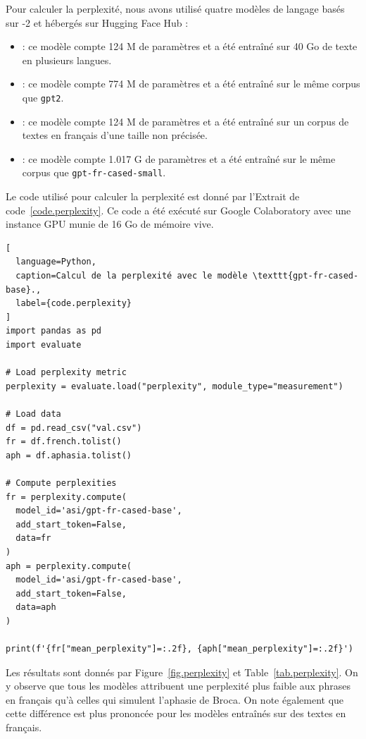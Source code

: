 Pour calculer la perplexité, nous avons utilisé quatre modèles de langage basés sur -2
et hébergés sur \foreignlanguage{english}{Hugging Face Hub} :
\begin{itemize}
  \item {} : 
  ce modèle compte 124 M de paramètres et a été entraîné sur 40 Go de texte en plusieurs langues.
  \item {} :
  ce modèle compte 774 M de paramètres et a été entraîné sur le même corpus que \verb|gpt2|.
  \item {} :
  ce modèle compte 124 M de paramètres et a été entraîné sur un corpus de textes en français d'une taille non précisée.
  \item {} :
  ce modèle compte 1.017 G de paramètres et a été entraîné sur le même corpus que \verb|gpt-fr-cased-small|.
\end{itemize}
Le code utilisé pour calculer la perplexité est donné par l'Extrait de code~\ref{code.perplexity}.
Ce code a été exécuté sur Google Colaboratory avec une instance GPU munie de 16 Go de mémoire vive.

\begin{lstlisting}[
  language=Python,
  caption=Calcul de la perplexité avec le modèle \texttt{gpt-fr-cased-base}.,
  label={code.perplexity}
]
import pandas as pd
import evaluate

# Load perplexity metric
perplexity = evaluate.load("perplexity", module_type="measurement")

# Load data
df = pd.read_csv("val.csv")
fr = df.french.tolist()
aph = df.aphasia.tolist()

# Compute perplexities
fr = perplexity.compute(
  model_id='asi/gpt-fr-cased-base', 
  add_start_token=False, 
  data=fr
)
aph = perplexity.compute(
  model_id='asi/gpt-fr-cased-base', 
  add_start_token=False, 
  data=aph
)

print(f'{fr["mean_perplexity"]=:.2f}, {aph["mean_perplexity"]=:.2f}')
\end{lstlisting}

Les résultats sont donnés par Figure~\ref{fig.perplexity} et Table~\ref{tab.perplexity}.
On y observe que tous les modèles attribuent une perplexité plus faible 
aux phrases en français qu'à celles qui simulent l'aphasie de Broca.
On note également que cette différence est plus prononcée pour les modèles entraînés sur des textes en français.

